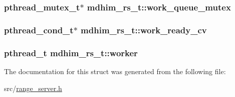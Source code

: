 \hypertarget{structmdhim__rs__t_ab2c8635cf5b4ab05bdf8385960e3c490}{
\subsubsection[{work\-\_\-queue\-\_\-mutex}]{\setlength{\rightskip}{0pt plus 5cm}pthread\-\_\-mutex\-\_\-t$\ast$ mdhim\-\_\-rs\-\_\-t\-::work\-\_\-queue\-\_\-mutex}}\label{structmdhim__rs__t_ab2c8635cf5b4ab05bdf8385960e3c490}
\hypertarget{structmdhim__rs__t_ab62cc2fae8553bb08e04f4365a94ec93}{
\subsubsection[{work\-\_\-ready\-\_\-cv}]{\setlength{\rightskip}{0pt plus 5cm}pthread\-\_\-cond\-\_\-t$\ast$ mdhim\-\_\-rs\-\_\-t\-::work\-\_\-ready\-\_\-cv}}\label{structmdhim__rs__t_ab62cc2fae8553bb08e04f4365a94ec93}
\hypertarget{structmdhim__rs__t_a0d5b280f18a5ff536779911d65a50529}{
\subsubsection[{worker}]{\setlength{\rightskip}{0pt plus 5cm}pthread\-\_\-t mdhim\-\_\-rs\-\_\-t\-::worker}}\label{structmdhim__rs__t_a0d5b280f18a5ff536779911d65a50529}


The documentation for this struct was generated from the following file\-:\begin{DoxyCompactItemize}
\item 
src/\hyperlink{range__server_8h}{range\-\_\-server.\-h}\end{DoxyCompactItemize}
